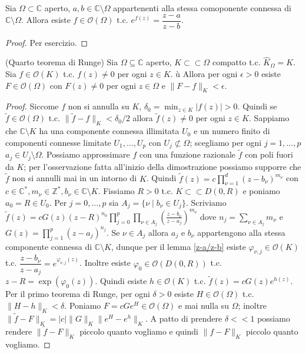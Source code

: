 \begin{lm} \label{z-a/z-b}
  Sia $\Omega \subset \mathbb{C}$ aperto, $a, b \in \mathbb{C}\setminus\Omega$ appartenenti alla stessa comoponente connessa di $\mathbb{C}\setminus\Omega$. Allora esiste $f \in \mathcal{O}(\Omega)$ t.c. $e^{f(z)}=\dfrac{z-a}{z-b}$.
\end{lm}

\begin{proof}
  Per esercizio.
\end{proof}

\begin{thm}
  (Quarto teorema di Runge) Sia $\Omega \subseteq \mathbb{C}$ aperto, $K\subset\subset\Omega$ compatto t.c. $\widehat{K}_{\Omega}=K$. Sia $f \in \mathcal{O}(K)$ t.c. $f(z) \not=0$ per ogni $z \in K$. ù
  Allora per ogni $\epsilon>0$ esiste $F \in \mathcal{O}(\Omega)$ con $F(z) \not=0$ per ogni $z \in \Omega$ e $\|F-f\|_K<\epsilon$.
\end{thm}

\begin{proof}
  Siccome $f$ non si annulla su $K$, $\displaystyle \delta_0=\min_{z \in K} |f(z)|>0$. Quindi se $\tilde{f} \in \mathcal{O}(\Omega)$ t.c. $\|\tilde{f}-f\|_K<\delta_0/2$ allora $\tilde{f}(z)\not=0$ per ogni $z \in K$.
  Sappiamo che $\mathbb{C}\setminus K$ ha una componente connessa illimitata $U_0$ e un numero finito di componenti connesse limitate $U_1, \dots, U_p$ con $U_j \not\subset \Omega$; scegliamo per ogni $j=1, \dots, p$ $a_j \in U_j \setminus \Omega$. Possiamo approssimare $f$ con una funzione razionale $\tilde{f}$ con poli fuori da $K$; per l'osservazione fatta all'inizio della dimostrazione possiamo supporre che $\tilde{f}$ non si annulli mai in un intorno di $K$.
  Quindi $\displaystyle \tilde{f}(z)=c\prod_{\nu=1}^d (z-b_{\nu})^{m_{\nu}}$ con $c \in \mathbb{C}^*, m_{\nu} \in \mathbb{Z}^*, b_{\nu} \in \mathbb{C}\setminus K$. Fissiamo $R>0$ t.c. $K \subset\subset D(0,R)$ e poniamo $a_0=R \in U_0$.
  Per $j=0, \dots, p$ sia $A_j=\{\nu \mid b_{\nu} \in U_j\}$.
  Scriviamo $\displaystyle \tilde{f}(z)=cG(z)(z-R)^{n_0} \prod_{j=0}^p \prod_{\nu \in A_j} \left(\frac{z-b_{\nu}}{z-a_j}\right)^{m_{\nu}}$ dove $\displaystyle n_{j}=\sum_{\nu \in A_j} m_{\nu}$ e $\displaystyle G(z)=\prod_{j=1}^p (z-a_j)^{n_j}$.
  Se $\nu \in A_j$ allora $a_j$ e $b_{\nu}$ appartengono alla stessa componente connessa di $\mathbb{C} \setminus K$, dunque per il lemma \ref{z-a/z-b} esiste $\varphi_{\nu, j} \in \mathcal{O}(K)$ t.c. $\dfrac{z-b_{\nu}}{z-a_j}=e^{\varphi_{\nu, j}(z)}$.
  Inoltre esiste $\varphi_0 \in \mathcal{O}(D(0, R))$ t.c. $z-R=\exp(\varphi_0(z))$. Quindi esiste $h \in \mathcal{O}(K)$ t.c. $\tilde{f}(z)=cG(z)e^{h(z)}$. Per il primo teorema di Runge, per ogni $\delta>0$ esiste $H \in \mathcal{O}(\Omega)$ t.c. $\|H-h\|_K<\delta$.
  Poniamo $F=cGe^H \in \mathcal{O}(\Omega)$ e mai nulla su $\Omega$; inoltre $\|\tilde{f}-F\|_K=|c|\|G\|_K\|e^H-e^h\|_K$. A patto di prendere $\delta<<1$ possiamo rendere $\|\tilde{f}-F\|_K$ piccolo quanto vogliamo e quindi $\|f-F\|_K$ piccolo quanto vogliamo.
\end{proof}

